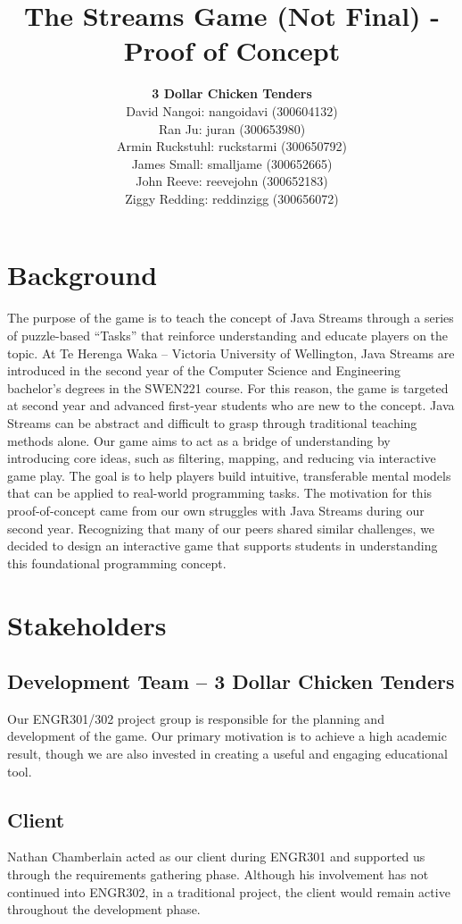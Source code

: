 \documentclass{article}
\title{The Streams Game (Not Final) - Proof of Concept}
\author{ 
    \textbf{3 Dollar Chicken Tenders}
    \\
    David Nangoi: nangoidavi (300604132) \\ 
    Ran Ju: juran (300653980) \\ 
    Armin Ruckstuhl: ruckstarmi (300650792) \\ 
    James Small: smalljame (300652665) \\ 
    John Reeve: reevejohn (300652183) \\ 
    Ziggy Redding: reddinzigg (300656072) 
}
\date{}
\begin{document}
\maketitle

\section{Background}
The purpose of the game is to teach the concept of Java Streams through a series of puzzle-based “Tasks” that reinforce understanding and educate players on the topic. At Te Herenga Waka – Victoria University of Wellington, Java Streams are introduced in the second year of the Computer Science and Engineering bachelor’s degrees in the SWEN221 course. For this reason, the game is targeted at second year and advanced first-year students who are new to the concept. 
\newline\newline
Java Streams can be abstract and difficult to grasp through traditional teaching methods alone. Our game aims to act as a bridge of understanding by introducing core ideas, such as filtering, mapping, and reducing via interactive game play. The goal is to help players build intuitive, transferable mental models that can be applied to real-world programming tasks. 
\newline\newline
The motivation for this proof-of-concept came from our own struggles with Java Streams during our second year. Recognizing that many of our peers shared similar challenges, we decided to design an interactive game that supports students in understanding this foundational programming concept. 

\section{Stakeholders}

\subsection*{Development Team – 3 Dollar Chicken Tenders}
Our ENGR301/302 project group is responsible for the planning and development of the game. Our primary motivation is to achieve a high academic result, though we are also invested in creating a useful and engaging educational tool.

\subsection*{Client}
Nathan Chamberlain acted as our client during ENGR301 and supported us through the requirements gathering phase. Although his involvement has not continued into ENGR302, in a traditional project, the client would remain active throughout the development phase.
\end{document}
